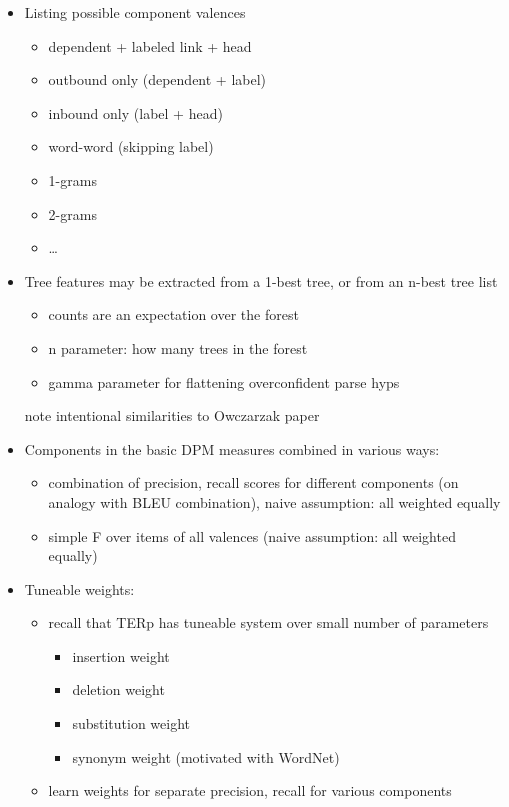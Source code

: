 \documentclass{kluwer}    %
\begin{document}
\begin{article}
\begin{itemize}
\item Listing possible component valences
  \begin{itemize}
  \item dependent + labeled link + head 
  \item outbound only (dependent +
    label)
  \item inbound only (label + head)
  \item word-word (skipping label)
  \end{itemize}
  \begin{itemize}
  \item 1-grams
  \item 2-grams
  \item \ldots{}
  \end{itemize}
  
    
\item Tree features may be extracted from a 1-best tree, or from an
  n-best tree list 

  \begin{itemize}
  \item  counts are an expectation over the forest
  \item n parameter: how many trees in the forest
  \item gamma parameter for flattening overconfident parse hyps
  \end{itemize}
  note intentional similarities to Owczarzak paper


\item Components in the basic DPM measures combined in various ways:

  \begin{itemize}
  \item combination of precision, recall scores for different
    components (on analogy with BLEU combination), naive assumption:
    all weighted equally

  \item simple F over items of all valences (naive assumption: all
    weighted equally)
  \end{itemize}
\item Tuneable weights:
  \begin{itemize}
  \item recall that TERp has tuneable system over small number of parameters
    \begin{itemize}
    \item insertion weight
    \item deletion weight
    \item substitution weight
    \item synonym weight (motivated with WordNet)
    \end{itemize}
  \item learn weights for separate precision, recall for various
    components
  \end{itemize}
  

\end{itemize}
\end{article}
\end{document}
